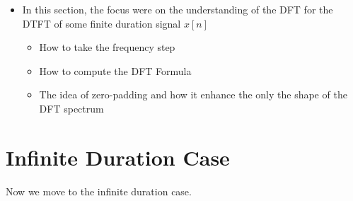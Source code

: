 \documentclass[12pt,a4paper]{book}
\begin{document}
\begin{itemize}
    \item In this section, the focus were on the understanding of the DFT for the DTFT of some finite duration signal $x[n]$
    
    
    \begin{itemize}
        \item How to take the frequency step
        
        \item How to compute the DFT Formula
        
        \item The idea of zero-padding and how it enhance the only the shape of the DFT spectrum
    \end{itemize}
    
    
\end{itemize}


\section{Infinite Duration Case}
\label{Sec:DFT:Infinite_Duration}
Now we move to the infinite duration case.
\end{document}
